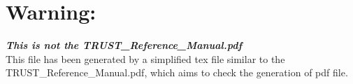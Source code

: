 \documentclass{article}[11pt]
\begin{document}
\section{Warning:}
\textit{\textbf{This is not the TRUST\_Reference\_Manual.pdf}} \\
This file has been generated by a simplified tex file similar to the TRUST\_Reference\_Manual.pdf, which aims to check the generation of pdf file.
\end{document}
